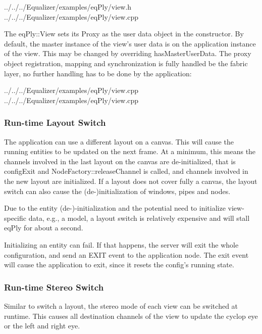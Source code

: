 \documentclass[10pt,a4]{scrartcl}
\begin{document}
{\footnotesize
  {../../../Equalizer/examples/eqPly/view.h}}
{\footnotesize
  {../../../Equalizer/examples/eqPly/view.cpp}}

The \textsf{eqPly::View} sets its \textsf{Proxy} as the user data object in the
constructor. By default, the master instance of the view's user data is on the
application instance of the view. This may be changed by overriding
\textsf{hasMasterUserData}. The proxy object registration, mapping and
synchronization is fully handled be the \textsf{fabric} layer, no further
handling has to be done by the application:

{\footnotesize
  {../../../Equalizer/examples/eqPly/view.cpp}}
{\footnotesize
  {../../../Equalizer/examples/eqPly/view.cpp}}

\subsubsection{Run-time Layout Switch}

The application can use a different layout on a canvas. This will cause
the running entities to be updated on the next frame. At a minimum, this
means the channels involved in the last layout on the canvas are
de-initialized, that is \textsf{configExit} and
\textsf{NodeFactory::releaseChannel} is called, and channels involved in
the new layout are initialized. If a layout does not cover fully a
canvas, the layout switch can also cause the (de-)initialization of
windows, pipes and nodes.

Due to the entity (de-)-initialization and the potential need to
initialize view-specific data, e.g., a model, a layout switch is
relatively expensive and will stall \textsf{eqPly} for about a second.

Initializing an entity can fail. If that happens, the server will exit
the whole configuration, and send an \textsf{EXIT} event to the
application node. The exit event will cause the application to exit,
since it resets the config's running state.

\subsubsection{Run-time Stereo Switch}

Similar to switch a layout, the stereo mode of each view can be switched at
runtime. This causes all destination channels of the view to update the cyclop
eye or the left and right eye.
\end{document}
